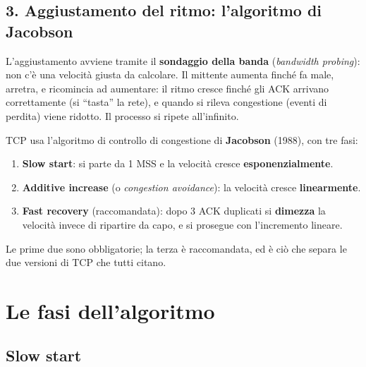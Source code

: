 \subsection{3. Aggiustamento del ritmo: l'algoritmo di Jacobson}

L'aggiustamento avviene tramite il \textbf{sondaggio della banda} (\emph{bandwidth probing}): non c'è una velocità
giusta da calcolare. Il mittente aumenta finché fa male, arretra, e ricomincia ad aumentare: il ritmo cresce finché gli ACK
arrivano correttamente (si ``tasta'' la rete), e quando si rileva congestione (eventi di perdita) viene ridotto. Il
processo si ripete all'infinito.

TCP usa l'algoritmo di controllo di congestione di \textbf{Jacobson} (1988), con tre fasi:

\begin{enumerate}
    \item \textbf{Slow start}: si parte da 1 MSS e la velocità cresce \textbf{esponenzialmente}.
    \item \textbf{Additive increase} (o \emph{congestion avoidance}): la velocità cresce \textbf{linearmente}.
    \item \textbf{Fast recovery} (raccomandata): dopo 3 ACK duplicati si \textbf{dimezza} la velocità invece di
          ripartire da capo, e si prosegue con l'incremento lineare.
\end{enumerate}
Le prime due sono obbligatorie; la terza è raccomandata, ed è ciò che separa le due versioni di TCP che tutti citano.

\section{Le fasi dell'algoritmo}

\subsection{Slow start}


